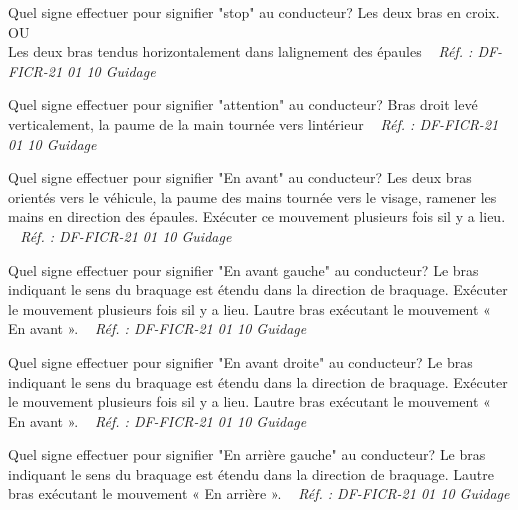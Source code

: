 \documentclass[grid,avery5371,landscape]{flashcards}
\makeatletter
\newcounter{nocarte}
\newcommand{\categ}[1]{%
  \def\@categ{#1}%
  \setcounter{nocarte}{0}%
}
\newcommand{\source}[1]{%
  \medskip
  \itshape%
   ~ \hfill Réf. : #1}
\makeatother
\begin{document}
\color[HTML]{01DFA5}
\categ{TECH}
\begin{flashcard}[véhicule]{
 Quel signe effectuer pour signifier "stop" au conducteur?   }
  Les deux bras en croix. \\ OU \\ Les deux bras tendus horizontalement dans lalignement des épaules
  \source{DF-FICR-21 01 10 Guidage}
\end{flashcard}


\color[HTML]{01DFA5}
\categ{TECH}
\begin{flashcard}[véhicule]{
 Quel signe effectuer pour signifier "attention" au conducteur?   }
  Bras droit levé verticalement, la paume de la main tournée vers lintérieur
  \source{DF-FICR-21 01 10 Guidage}
\end{flashcard}


\color[HTML]{01DFA5}
\categ{TECH}
\begin{flashcard}[véhicule]{
 Quel signe effectuer pour signifier "En avant" au conducteur?   }
  Les deux bras orientés vers le véhicule, la paume des mains tournée vers le visage, ramener les mains en direction des épaules.
Exécuter ce mouvement plusieurs fois sil y a lieu.
  \source{DF-FICR-21 01 10 Guidage}
\end{flashcard}


\color[HTML]{01DFA5}
\categ{TECH}
\begin{flashcard}[véhicule]{
 Quel signe effectuer pour signifier "En avant gauche" au conducteur?   }
  Le bras indiquant le sens du braquage est étendu dans la direction de braquage.
Exécuter le mouvement plusieurs fois sil y a lieu.
Lautre bras exécutant le mouvement « En avant ».
  \source{DF-FICR-21 01 10 Guidage}
\end{flashcard}


\color[HTML]{01DFA5}
\categ{TECH}
\begin{flashcard}[véhicule]{
 Quel signe effectuer pour signifier "En avant droite" au conducteur?   }
  Le bras indiquant le sens du braquage est étendu dans la direction de braquage.
Exécuter le mouvement plusieurs fois sil y a lieu.
Lautre bras exécutant le mouvement « En avant ».
  \source{DF-FICR-21 01 10 Guidage}
\end{flashcard}


\color[HTML]{01DFA5}
\categ{TECH}
\begin{flashcard}[véhicule]{
 Quel signe effectuer pour signifier "En arrière gauche" au conducteur?   }
  Le bras indiquant le sens du braquage est étendu dans la direction de braquage. Lautre bras exécutant le mouvement « En arrière ».
  \source{DF-FICR-21 01 10 Guidage}
\end{flashcard}
\end{document}
